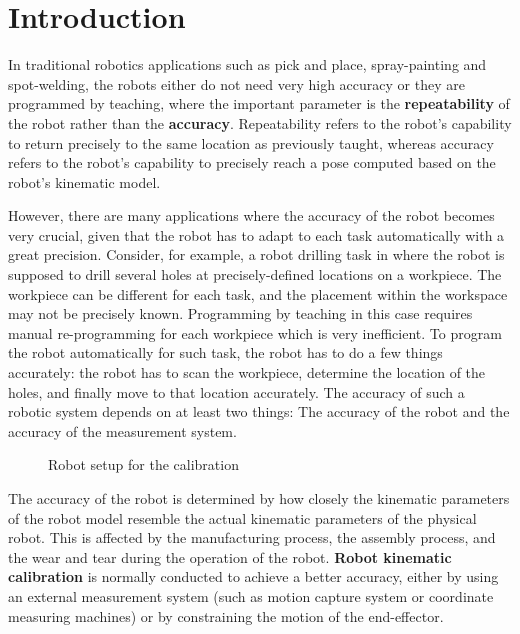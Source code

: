 \section{Introduction}
\label{sec:introduction}

In traditional robotics applications such as pick and place, spray-painting and spot-welding, the robots either do not need very high accuracy or they are programmed by teaching, where the important parameter is the \textbf{repeatability} of the robot rather than the \textbf{accuracy}. Repeatability refers to the robot's capability to return precisely to the same location as previously taught, whereas accuracy refers to the robot's capability to precisely reach a pose computed based on the robot's kinematic model. 

However, there are many applications where the accuracy of the robot becomes very crucial, given that the robot has to adapt to each task automatically with a great precision. Consider, for example, a robot drilling task in \cite{Suarez-Ruiz2018} where the robot is supposed to drill several holes at precisely-defined locations on a workpiece. The workpiece can be different for each task, and the placement within the workspace may not be precisely known. Programming by teaching in this case requires manual re-programming for each workpiece which is very inefficient. To program the robot automatically for such task, the robot has to do a few things accurately: the robot has to scan the workpiece, determine the location of the holes, and finally move to that location accurately. The accuracy of such a robotic system depends on at least two things: The accuracy of the robot and the accuracy of the measurement system. 


\begin{figure}[t]
  \centering
  \vspace*{2mm}
  \caption{Robot setup for the calibration}
  \label{fig:robot_setup}
\end{figure}

The accuracy of the robot is determined by how closely the kinematic parameters of the robot model resemble the actual kinematic parameters of the physical robot. This is affected by the manufacturing process, the assembly process, and the wear and tear during the operation of the robot. \textbf{Robot kinematic calibration} is normally conducted to achieve a better accuracy, either by using an external measurement system (such as motion capture system or coordinate measuring machines) or by constraining the motion of the end-effector.

